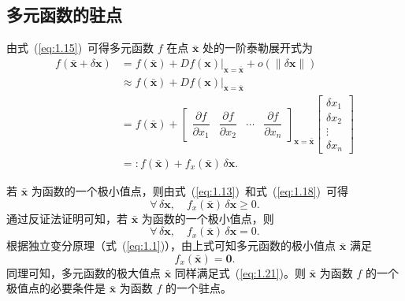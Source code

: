 \subsection{多元函数的驻点}

由式~(\ref{eq:1.15})~可得多元函数 $f$ 在点 $\bar{\boldsymbol{x}}$ 处的一阶泰勒展开式为
\begin{equation}\label{eq:1.18}
\begin{aligned}
f(\bar{\boldsymbol{x}} + \delta\boldsymbol{x}) &= f(\bar{\boldsymbol{x}}) + Df(\boldsymbol{x})\big|_{\boldsymbol{x}=\bar{\boldsymbol{x}}} + o(\|\delta\boldsymbol{x}\|) \\
&\approx f(\bar{\boldsymbol{x}}) + Df(\boldsymbol{x})\big|_{\boldsymbol{x}=\bar{\boldsymbol{x}}} \\
&= f(\bar{\boldsymbol{x}}) + \begin{bmatrix} \dfrac{\partial f}{\partial x_1} & \dfrac{\partial f}{\partial x_2} & \cdots & \dfrac{\partial f}{\partial x_n} \end{bmatrix}_{\boldsymbol{x}=\bar{\boldsymbol{x}}} \!\begin{bmatrix} \delta x_1 \\ \delta x_2 \\ \vdots \\ \delta x_n \end{bmatrix} \\
&=: f(\bar{\boldsymbol{x}}) + f_x(\bar{\boldsymbol{x}})\,\delta\boldsymbol{x}.
\end{aligned}
\end{equation}

若 $\bar{\boldsymbol{x}}$ 为函数的一个极小值点，则由式~(\ref{eq:1.13})~和式~(\ref{eq:1.18})~可得
\begin{equation}\label{eq:1.19}
\forall\, \delta\boldsymbol{x}, \quad f_x(\bar{\boldsymbol{x}})\,\delta\boldsymbol{x} \geq 0.
\end{equation}
通过反证法证明可知，若 $\bar{\boldsymbol{x}}$ 为函数的一个极小值点，则
\begin{equation}\label{eq:1.20}
\forall\, \delta\boldsymbol{x}, \quad f_x(\bar{\boldsymbol{x}})\,\delta\boldsymbol{x} = 0.
\end{equation}
根据独立变分原理（式~(\ref{eq:1.1})），由上式可知多元函数的极小值点 $\bar{\boldsymbol{x}}$ 满足
\begin{equation}\label{eq:1.21}
f_x(\bar{\boldsymbol{x}}) = \boldsymbol{0}.
\end{equation}
同理可知，多元函数的极大值点 $\bar{\boldsymbol{x}}$ 同样满足式~(\ref{eq:1.21})。则 $\bar{\boldsymbol{x}}$ 为函数 $f$ 的一个极值点的必要条件是 $\bar{\boldsymbol{x}}$ 为函数 $f$ 的一个驻点。

